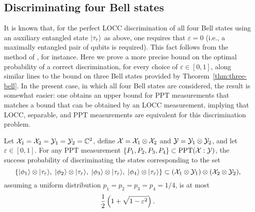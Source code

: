 \subsection{Discriminating four Bell states}

It is known that, for the perfect LOCC discrimination of all four Bell states
using an auxiliary entangled state $\lvert\mspace{0.5mu} \tau_{\varepsilon} \mspace{0.5mu} \rangle$ as above,
one requires that $\varepsilon = 0$ (i.e., a maximally entangled pair of qubits
is required).
This fact follows from the method of \cite{Horodecki03}, for instance.
Here we prove a more precise bound on the optimal probability of a correct
discrimination, for every choice of $\varepsilon\in[0,1]$, along similar lines
to the bound on three Bell states provided by Theorem~\ref{thm:three-bell}.
In the present case, in which all four Bell states are considered, the result
is somewhat easier: one obtains an upper bound for PPT measurements that
matches a bound that can be obtained by an LOCC measurement,
implying that LOCC, separable, and PPT measurements are equivalent for this
discrimination problem.

\begin{theorem}
  \label{thm:four-bell}
  Let $\mathcal{X}_1 = \mathcal{X}_2 = \mathcal{Y}_1 = \mathcal{Y}_2 = \mathbb{C}^2$, define
  $\mathcal{X} = \mathcal{X}_1 \otimes \mathcal{X}_2$ and $\mathcal{Y} = \mathcal{Y}_1 \otimes \mathcal{Y}_2$, and let
  $\varepsilon\in [0,1]$.
  For any PPT measurement $\{P_1,P_2,P_3,P_4\}\subset\mathrm{PPT}(\mathcal{X}:\mathcal{Y})$, the success
  probability of discriminating the states corresponding to the set
  \begin{equation}
    \label{eq:set-four-bells}
    \left\{ \lvert\mspace{0.5mu} \phi_{1} \mspace{0.5mu} \rangle \otimes \lvert\mspace{0.5mu} \tau_{\varepsilon} \mspace{0.5mu} \rangle,\; 
    \lvert\mspace{0.5mu} \phi_{2} \mspace{0.5mu} \rangle \otimes \lvert\mspace{0.5mu} \tau_{\varepsilon} \mspace{0.5mu} \rangle,\;
    \lvert\mspace{0.5mu} \phi_{3} \mspace{0.5mu} \rangle \otimes \lvert\mspace{0.5mu} \tau_{\varepsilon} \mspace{0.5mu} \rangle,\; 
    \lvert\mspace{0.5mu} \phi_{4} \mspace{0.5mu} \rangle \otimes \lvert\mspace{0.5mu} \tau_{\varepsilon} \mspace{0.5mu} \rangle\right\} 
    \subset (\mathcal{X}_1\otimes\mathcal{Y}_1)\otimes(\mathcal{X}_2\otimes\mathcal{Y}_2),
  \end{equation}
  assuming a uniform distribution $p_1 = p_2 = p_3 = p_4 = 1/4$, is at most
  \begin{equation}
    \label{eq:probability-four-bell}
    \frac{1}{2}\left(1 + \sqrt{1 - \varepsilon^2}\right).
  \end{equation}
\end{theorem}

